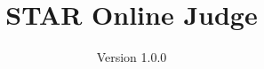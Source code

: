 \documentclass[12pt]{book}
\title{STAR Online Judge}
\author{Version 1.0.0}
\date{}
\begin{document}
\maketitle

\pagebreak




\tableofcontents
\frontmatter
\pagebreak

\mainmatter

\pagebreak

\pagebreak

\pagebreak

\pagebreak

\pagebreak

\pagebreak



\newpage
\end{document}
